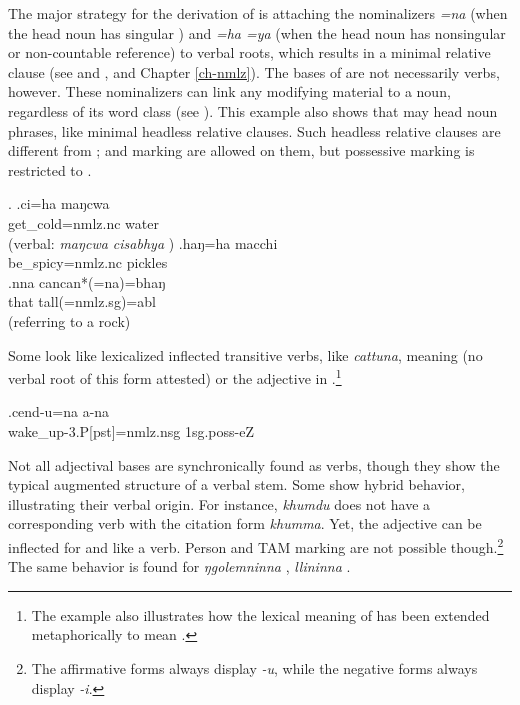 The major strategy for the derivation of  is attaching the nominalizers \emph{=na} (when the head noun has singular ) and \emph{=ha \ti =ya} (when the head noun has nonsingular  or non-countable reference) to verbal roots, which results in a minimal relative clause (see \Next[a] and \Next[b], and Chapter \ref{ch-nmlz}). The bases of  are not necessarily verbs, however. These nominalizers can link any modifying material to a noun, regardless of its word class (see \Next[c]). This example also shows that  may head noun phrases, like minimal headless relative clauses. Such headless relative clauses are different from ;  and  marking are allowed on them, but possessive marking is restricted to . 

\ex. \ag.ci=ha maŋcwa\\
get\_cold{\sc =nmlz.nc} water\\
 (verbal: \emph{maŋcwa cisabhya} )
	\bg.haŋ=ha macchi\\
	be\_spicy{\sc =nmlz.nc} pickles\\
 	\bg.nna cancan*(=na)=bhaŋ\\
		that tall{\sc *(=nmlz.sg)=abl}\\
	  (referring to a rock)
	
Some  look like  lexicalized inflected transitive verbs, like \emph{cattuna}, meaning   (no verbal root of this form attested) or the adjective in \Next.\footnote{The example also illustrates how the lexical meaning of  has been extended metaphorically to mean .} 
	
	\exg.cend-u=na a-na \\
  wake\_up{\sc -3.P[pst]=nmlz.nsg} {\sc 1sg.poss-}eZ\\
   
  

Not all adjectival bases are synchronically found as verbs, though they show the typical augmented structure of a verbal stem. Some  show hybrid behavior, illustrating their verbal origin. For instance, \emph{khumdu}  does not have a corresponding verb with the citation form \emph{khumma}. Yet, the adjective can be inflected for  and  like a verb. Person and TAM marking are not possible though.\footnote{The affirmative forms always display \emph{-u}, while the negative forms always display \emph{-i}.} The same behavior is found for \emph{ŋgolemninna} ,  \emph{llininna} .

